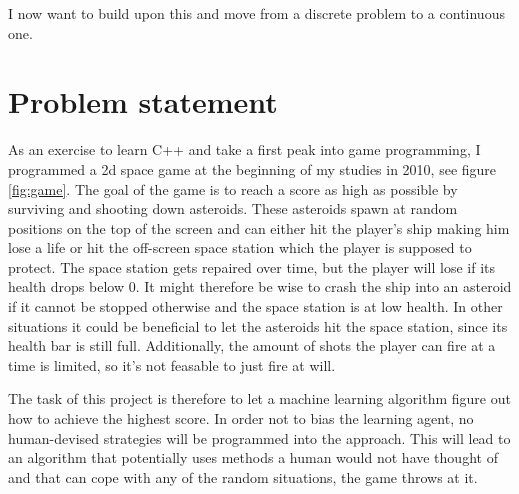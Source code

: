 \documentclass[a4paper,10pt]{article}
\begin{document}
I now want to build upon this and move from a discrete problem to a continuous one.


\section{Problem statement}
% 
As an exercise to learn C++ and take a first peak into game programming, I programmed a 2d space game at the beginning of my studies in 2010, see figure \ref{fig:game}.
The goal of the game is to reach a score as high as possible by surviving and shooting down asteroids.
These asteroids spawn at random positions on the top of the screen and can either hit the player's ship making him lose a life or hit the off-screen space station which the player is supposed to protect.
The space station gets repaired over time, but the player will lose if its health drops below $0$.
It might therefore be wise to crash the ship into an asteroid if it cannot be stopped otherwise and the space station is at low health.
In other situations it could be beneficial to let the asteroids hit the space station, since its health bar is still full.
Additionally, the amount of shots the player can fire at a time is limited, so it's not feasable to just fire at will.

The task of this project is therefore to let a machine learning algorithm figure out how to achieve the highest score.
In order not to bias the learning agent, no human-devised strategies will be programmed into the approach.
This will lead to an algorithm that potentially uses methods a human would not have thought of and that can cope with any of the random situations, the game throws at it.
\end{document}
